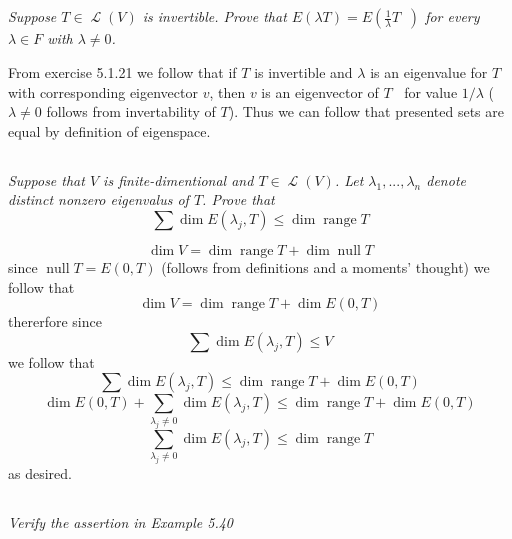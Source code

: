 \documentclass[11pt,oneside,titlepage]{book}
\DeclareMathOperator \map {\mathcal {L}}
\DeclareMathOperator \ns {null}
\DeclareMathOperator \range {range}
\DeclareMathOperator \inv {^{-1}}
\begin{document}
\subsection{}

\textit{Suppose $T \in \map(V)$ is invertible. Prove that
  $E (\lambda T) = E(\frac{1}{\lambda} T \inv)$ for every $\lambda \in F$ with $\lambda \neq 0$.}

From exercise 5.1.21 we follow that if $T$ is invertible and $\lambda$ is an eigenvalue for $T$
with corresponding eigenvector $v$,  then $v$ is an eigenvector of $T \inv$ for
value $1/\lambda$  ($\lambda \neq 0$ follows from invertability of $T$). Thus we can follow that
presented sets are equal by definition of eigenspace.

\subsection{}

\textit{Suppose that $V$ is finite-dimentional and $T \in \map(V)$. Let $\lambda_1, ..., \lambda_n$
  denote distinct nonzero eigenvalus of $T$. Prove that }
$$\sum \dim E(\lambda_j, T) \leq \dim \range T$$


$$\dim V = \dim \range T + \dim \ns T$$
since $\ns T = E(0, T)$ (follows from definitions and a moments' thought) we follow that
$$\dim V = \dim \range T + \dim E(0, T)$$
thererfore since
$$\sum \dim E(\lambda_j, T) \leq V$$
we follow that 
$$\sum \dim E(\lambda_j, T) \leq \dim \range T + \dim E(0, T)$$
$$\dim E(0, T) + \sum_{\lambda_j \neq 0} \dim E(\lambda_j, T) \leq \dim \range T + \dim E(0, T)$$
$$\sum_{\lambda_j \neq 0} \dim E(\lambda_j, T) \leq \dim \range T$$
as desired.

\subsection{}

\textit{Verify the assertion in Example 5.40}
\end{document}
